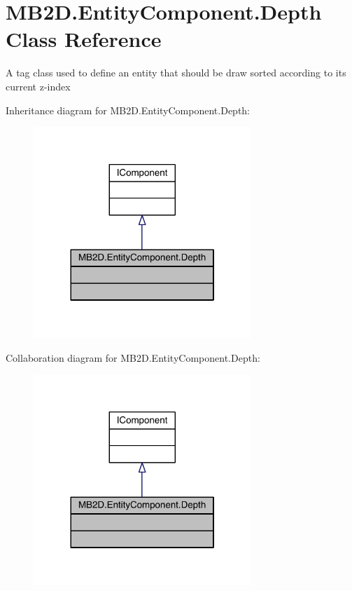 \hypertarget{class_m_b2_d_1_1_entity_component_1_1_depth}{}\section{M\+B2\+D.\+Entity\+Component.\+Depth Class Reference}
\label{class_m_b2_d_1_1_entity_component_1_1_depth}


A tag class used to define an entity that should be draw sorted according to its current z-\/index  




Inheritance diagram for M\+B2\+D.\+Entity\+Component.\+Depth\+:\nopagebreak
\begin{figure}[H]
\begin{center}
\leavevmode
\includegraphics[width=233pt]{class_m_b2_d_1_1_entity_component_1_1_depth__inherit__graph}
\end{center}
\end{figure}


Collaboration diagram for M\+B2\+D.\+Entity\+Component.\+Depth\+:\nopagebreak
\begin{figure}[H]
\begin{center}
\leavevmode
\includegraphics[width=233pt]{class_m_b2_d_1_1_entity_component_1_1_depth__coll__graph}
\end{center}
\end{figure}


